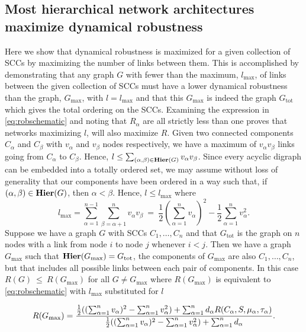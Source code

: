 \subsection{Most hierarchical network architectures maximize dynamical robustness}
Here we show that dynamical robustness is maximized for a given collection of SCCs by maximizing the number of links between them. This is accomplished by demonstrating that any graph $G$ with fewer than the maximum, $l_{\mathrm{max}}$, of links between the given collection of SCCs must have a lower dynamical robustness than the graph, $G_{\mathrm{max}}$, with $l=l_{\mathrm{max}}$ and that this $G_{\mathrm{max}}$ is indeed the graph $G_{\mathrm{tot}}$ which gives the total ordering on the SCCs. Examining the expression in \ref{eq:robschematic} and noting that $R_{\alpha}$ are all strictly less than one proves that networks maximizing $l$, will also maximize $R$.  Given two connected components $C_{\alpha}$ and $C_{\beta}$ with $v_{\alpha}$ and $v_{\beta}$ nodes respectively, we have a maximum of $v_{\alpha} v_{\beta}$ links going from $C_{\alpha}$ to $C_{\beta}$.  Hence, $l \le \sum_{(\alpha,\beta) \in \mathbf{Hier}(G)} v_{\alpha} v_{\beta}$.  Since every acyclic digraph can be embedded into a totally ordered
set, we may assume without loss of generality that our components have
been ordered in a way such that, if $(\alpha,\beta) \in \mathbf{Hier}(G)$, then $\alpha <
\beta$.  Hence, $l \le l_{\mathrm{max}}$ where
$$l_{\mathrm{max}} = \sum_{\alpha=1}^{n-1}\sum_{\beta=\alpha+1}^{n}v_{\alpha}
v_{\beta}~=~\frac{1}{2} \left( \sum_{\alpha=1}^{n} v_{\alpha} \right)^2-\frac{1}{2} \sum_{\alpha=1}^{n}
v_{\alpha}^2.$$
Suppose we have a graph $G$ with SCCs $C_1,\ldots,C_n$ and that $G_{\mathrm{tot}}$
is the graph on $n$ nodes with a link from node $i$ to node $j$ whenever $i < j$.  Then we have a graph $G_{\mathrm{max}}$ such that $\mathbf{Hier} (G_{\mathrm{max}}) = G_{\mathrm{tot}}$, the components of $G_{\mathrm{max}}$ are also $C_1, \ldots, C_n$, but that includes all possible links between each pair of components. In this case $R(G)~\le~R(G_{\mathrm{max}})$ for all $G \ne G_{\mathrm{max}}$ where $R(G_{\mathrm{max}})$ is equivalent to \ref{eq:robschematic} with $l_{\mathrm{max}}$ substituted for $l$
\begin{widetext}
\begin{align} \label{eq:sccmaxrobustness}
R(G_{\mathrm{max}}) =
\frac{\frac{1}{2} ((\sum_{\alpha=1}^n v_{\alpha})^2 - \sum_{\alpha=1}^n v_{\alpha}^2) +
                    \sum_{\alpha=1}^n d_{\alpha}
                R(C_{\alpha},S,\mu_{\alpha},\tau_{\alpha})}
     {\frac{1}{2} ((\sum_{\alpha=1}^n v_{\alpha})^2 - \sum_{\alpha=1}^n v_{\alpha}^2) +
                    \sum_{\alpha=1}^n d_{\alpha}}.
\end{align}
\end{widetext}

